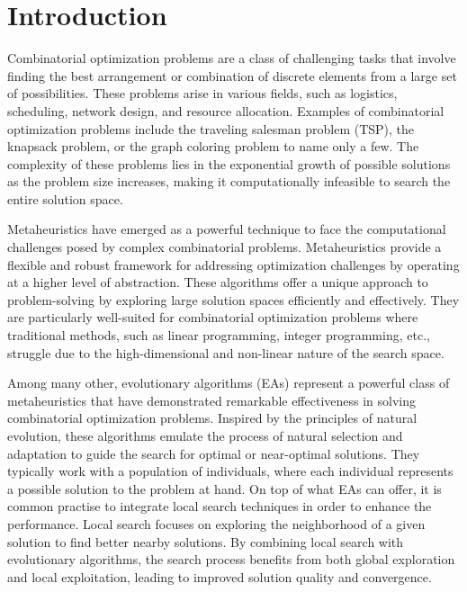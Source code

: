 \documentclass[twoside]{ctuthesis}
\theoremstyle{plain}
\theoremstyle{definition}
\theoremstyle{note}
\begin{document}
	
\maketitle


\chapter{Introduction}




Combinatorial optimization problems are a class of challenging tasks that involve finding the best arrangement or combination of discrete elements from a large set of possibilities. These problems arise in various fields, such as logistics, scheduling, network design, and resource allocation. Examples of combinatorial optimization problems include the traveling salesman problem (TSP), the knapsack problem, or the graph coloring problem to name only a few. The complexity of these problems lies in the exponential growth of possible solutions as the problem size increases, making it computationally infeasible to search the entire solution space.

Metaheuristics have emerged as a powerful technique to face the computational challenges posed by complex combinatorial problems. Metaheuristics provide a flexible and robust framework for addressing optimization challenges by operating at a higher level of abstraction. These algorithms offer a unique approach to problem-solving by exploring large solution spaces efficiently and effectively. They are particularly well-suited for combinatorial optimization problems where traditional methods, such as linear programming, integer programming, etc., struggle due to the high-dimensional and non-linear nature of the search space.

Among many other, evolutionary algorithms (EAs) represent a powerful class of metaheuristics that have demonstrated remarkable effectiveness in solving combinatorial optimization problems. Inspired by the principles of natural evolution, these algorithms emulate the process of natural selection and adaptation to guide the search for optimal or near-optimal solutions. They typically work with a population of individuals, where each individual represents a possible solution to the problem at hand. On top of what EAs can offer, it is common practise to integrate local search techniques in order to enhance the performance. Local search focuses on exploring the neighborhood of a given solution to find better nearby solutions. By combining local search with evolutionary algorithms, the search process benefits from both global exploration and local exploitation, leading to improved solution quality and convergence.
\end{document}
